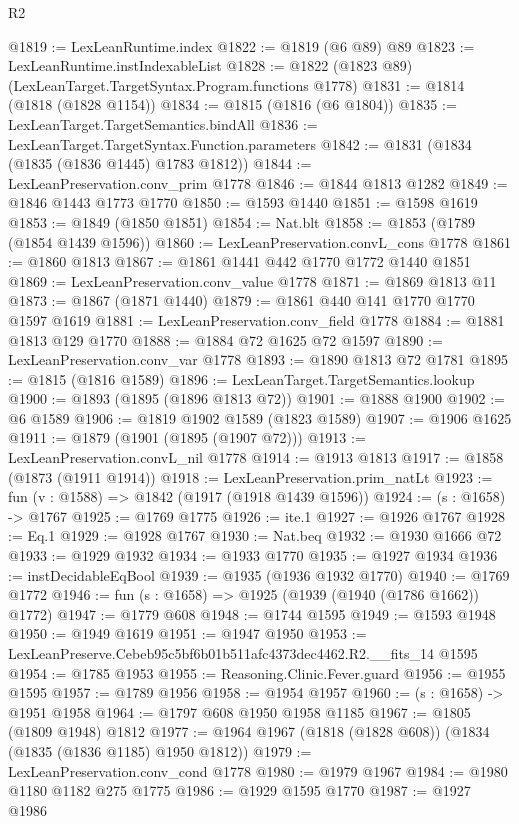 \begin{lexlean}{R2}
\begin{coremodule}
@1819 := LexLeanRuntime.index
@1822 := @1819 (@6 @89) @89
@1823 := LexLeanRuntime.instIndexableList
@1828 := @1822 (@1823 @89) (LexLeanTarget.TargetSyntax.Program.functions @1778)
@1831 := @1814 (@1818 (@1828 @1154))
@1834 := @1815 (@1816 (@6 @1804))
@1835 := LexLeanTarget.TargetSemantics.bindAll
@1836 := LexLeanTarget.TargetSyntax.Function.parameters
@1842 := @1831 (@1834 (@1835 (@1836 @1445) @1783 @1812))
@1844 := LexLeanPreservation.conv_prim @1778
@1846 := @1844 @1813 @1282
@1849 := @1846 @1443 @1773 @1770
@1850 := @1593 @1440
@1851 := @1598 @1619
@1853 := @1849 (@1850 @1851)
@1854 := Nat.blt
@1858 := @1853 (@1789 (@1854 @1439 @1596))
@1860 := LexLeanPreservation.convL_cons @1778
@1861 := @1860 @1813
@1867 := @1861 @1441 @442 @1770 @1772 @1440 @1851
@1869 := LexLeanPreservation.conv_value @1778
@1871 := @1869 @1813 @11
@1873 := @1867 (@1871 @1440)
@1879 := @1861 @440 @141 @1770 @1770 @1597 @1619
@1881 := LexLeanPreservation.conv_field @1778
@1884 := @1881 @1813 @129 @1770
@1888 := @1884 @72 @1625 @72 @1597
@1890 := LexLeanPreservation.conv_var @1778
@1893 := @1890 @1813 @72 @1781
@1895 := @1815 (@1816 @1589)
@1896 := LexLeanTarget.TargetSemantics.lookup
@1900 := @1893 (@1895 (@1896 @1813 @72))
@1901 := @1888 @1900
@1902 := @6 @1589
@1906 := @1819 @1902 @1589 (@1823 @1589)
@1907 := @1906 @1625
@1911 := @1879 (@1901 (@1895 (@1907 @72)))
@1913 := LexLeanPreservation.convL_nil @1778
@1914 := @1913 @1813
@1917 := @1858 (@1873 (@1911 @1914))
@1918 := LexLeanPreservation.prim_natLt
@1923 := fun (v : @1588) => @1842 (@1917 (@1918 @1439 @1596))
@1924 := (s : @1658) -> @1767
@1925 := @1769 @1775
@1926 := ite.{1}
@1927 := @1926 @1767
@1928 := Eq.{1}
@1929 := @1928 @1767
@1930 := Nat.beq
@1932 := @1930 @1666 @72
@1933 := @1929 @1932
@1934 := @1933 @1770
@1935 := @1927 @1934
@1936 := instDecidableEqBool
@1939 := @1935 (@1936 @1932 @1770)
@1940 := @1769 @1772
@1946 := fun (s : @1658) => @1925 (@1939 (@1940 (@1786 @1662)) @1772)
@1947 := @1779 @608
@1948 := @1744 @1595
@1949 := @1593 @1948
@1950 := @1949 @1619
@1951 := @1947 @1950
@1953 := LexLeanPreserve.Cebeb95c5bf6b01b511afc4373dec4462.R2.__fits_14 @1595
@1954 := @1785 @1953
@1955 := Reasoning.Clinic.Fever.guard
@1956 := @1955 @1595
@1957 := @1789 @1956
@1958 := @1954 @1957
@1960 := (s : @1658) -> @1951 @1958
@1964 := @1797 @608 @1950 @1958 @1185
@1967 := @1805 (@1809 @1948) @1812
@1977 := @1964 @1967 (@1818 (@1828 @608)) (@1834 (@1835 (@1836 @1185) @1950 @1812))
@1979 := LexLeanPreservation.conv_cond @1778
@1980 := @1979 @1967
@1984 := @1980 @1180 @1182 @275 @1775
@1986 := @1929 @1595 @1770
@1987 := @1927 @1986

\end{coremodule}
\end{lexlean}
